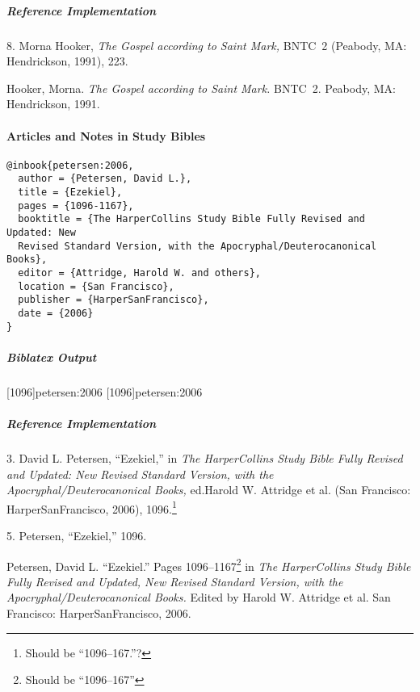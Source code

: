 \documentclass[a4paper]{article}
\newenvironment{biboutput}{%
  \subparagraph{Biblatex Output}
}{\color{black}}
\newenvironment{refimp}{%
  \subparagraph{Reference Implementation}
  \color{reference-colour}
  \rm
}{\par\color{black}}
\begin{document}
\begin{refimp}
  \hspace*{\bibindent}8. Morna Hooker, \emph{The Gospel according to Saint
  Mark,} BNTC~2 (Peabody, MA: Hendrickson, 1991), 223.

  \hangindent\bibindent Hooker, Morna. \emph{The Gospel according to Saint
  Mark.} BNTC~2. Peabody, MA: Hendrickson, 1991.

\end{refimp}

\paragraph{Articles and Notes in Study Bibles}

\begin{lstlisting}
@inbook{petersen:2006,
  author = {Petersen, David L.},
  title = {Ezekiel},
  pages = {1096-1167},
  booktitle = {The HarperCollins Study Bible Fully Revised and Updated: New
  Revised Standard Version, with the Apocryphal/Deuterocanonical Books},
  editor = {Attridge, Harold W. and others},
  location = {San Francisco},
  publisher = {HarperSanFrancisco},
  date = {2006}
}
\end{lstlisting}

\begin{biboutput}
  [1096]{petersen:2006}
  [1096]{petersen:2006}
\end{biboutput}

\begin{refimp}
  \hspace*{\bibindent}3. David L. Petersen, “Ezekiel,” in \emph{The
  HarperCollins Study Bible Fully Revised and Updated: New Revised Standard
  Version, with the Apocryphal\slash Deuterocanonical Books,} ed.\@ Harold W.
  Attridge et al. (San Francisco: HarperSanFrancisco, 2006),
  1096.\footnote{Should be “1096–167.”?}

  \hspace*{\bibindent}5. Petersen, “Ezekiel,” 1096.

  \hangindent\bibindent Petersen, David L. “Ezekiel.” Pages
  1096–1167\footnote{Should be “1096–167”} in \emph{The HarperCollins Study
  Bible Fully Revised and Updated, New Revised Standard Version, with the
  Apocryphal/Deuterocanonical Books.} Edited by Harold W. Attridge et al. San
  Francisco: HarperSanFrancisco, 2006.
\end{refimp}
\end{document}
